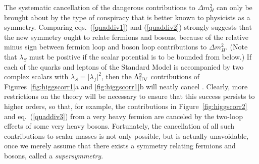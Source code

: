 \documentclass[11pt]{article}
\begin{document}
The systematic cancellation of the dangerous contributions to $\Delta
m_H^2$ can only be brought about by the type of conspiracy that is better
known to physicists as a symmetry. Comparing eqs.~(\ref{quaddiv1}) and
(\ref{quaddiv2}) strongly suggests that the new symmetry ought to relate
fermions and bosons, because of the relative minus sign between fermion
loop and boson loop contributions to $\Delta m_H^2$. (Note that
$\lambda_S$ must be positive if the scalar potential is to be bounded from
below.) If each of the quarks and leptons of the Standard Model is
accompanied by two complex scalars with $\lambda_S = |\lambda_f|^2$, then
the $\Lambda_{\rm UV}^2$ contributions of Figures~\ref{fig:higgscorr1}a
and \ref{fig:higgscorr1}b will neatly cancel \cite{quadscancel}. Clearly,
more restrictions on the theory will be necessary to ensure that this
success persists to higher orders, so that, for example, the contributions
in Figure~\ref{fig:higgscorr2} and eq.~(\ref{quaddiv3}) from a very heavy
fermion are canceled by the two-loop effects of some very heavy bosons.
Fortunately, the cancellation of all such contributions to scalar masses
is not only possible, but is actually unavoidable, once we merely assume
that there exists a symmetry relating fermions and bosons, called a 
{\it supersymmetry}. 
\end{document}
